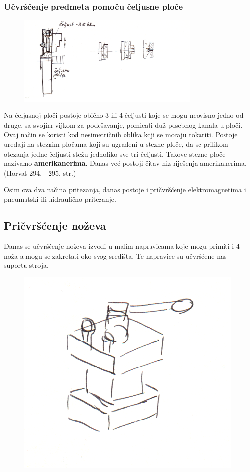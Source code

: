 \documentclass[a4paper,12pt]{article}
\numberwithin{figure}{section}
\begin{document}
\subsubsection{Učvršćenje predmeta pomoču čeljusne ploče}
\begin{figure}[!h]
\centering
\includegraphics[width=0.8\textwidth]{image_19-1.png}
\end{figure}
\FloatBarrier
Na čeljusnoj ploči postoje obično 3 ili 4 čeljusti koje se mogu neovisno jedno od druge, sa svojim vijkom za podešavanje, pomicati duž posebnog kanala u ploči. Ovaj način se koristi kod nesimetričnih oblika koji se moraju tokariti. Postoje uređaji na steznim pločama koji su ugrađeni u stezne ploče, da se prilikom otezanja  jedne čeljusti stežu jednoliko sve tri čeljusti. Takove stezne ploče nazivamo \textbf{amerikanerima}. Danas već postoji čitav niz riješenja amerikanerima. (Horvat 294. - 295. str.)\par
Osim ova dva načina pritezanja, danas postoje i pričvršćenje elektromagnetima i pneumatski ili hidraulično pritezanje.
\subsection{Pričvršćenje noževa}
Danas se učvršćenje noževa izvodi u malim napravicama koje mogu primiti i 4 noža a mogu se zakretati oko svog središta. Te napravice su učvršćene nas suportu stroja.
\begin{figure}[!h]
\centering
\includegraphics[scale=0.1]{image_19-2.png}
\end{figure}
\FloatBarrier
\end{document}
